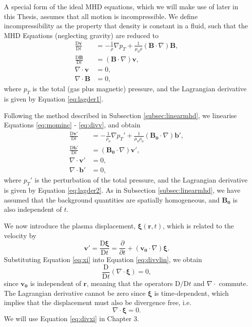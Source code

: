 A special form of the ideal MHD equations, which we will make use of later in this Thesis, assumes that all motion is incompressible.
We define incompressibility as the property that density is constant in a fluid, such that the MHD Equations (neglecting gravity) are reduced to
%
\begin{align}
\label{eq:mominc}
\frac{\mathrm{D} \mathbf v}{\mathrm{D} t}
& = - \frac{1}{\rho} \nabla p_T
+ \frac{1}{\mu_0 \rho} ( \mathbf{B} \cdot \nabla ) \mathbf{B},
\\[0.2cm]
\label{eq:indinc}
\frac{\mathrm{D} \mathbf B}{\mathrm{D} t}
& = ( \mathbf{B} \cdot \nabla ) \mathbf{v},
\\[0.2cm]
\label{eq:divv}
\nabla \cdot \mathbf{v} & = 0,
\\[0.1cm]
\nonumber
\nabla \cdot \mathbf{B} & = 0,
\end{align}
%
where $p_T$ is the total (gas plus magnetic) pressure, and the Lagrangian derivative is given by Equation \eqref{eq:lagder1}.

Following the method described in Subsection \ref{subsec:linearmhd}, we linearise Equations \eqref{eq:mominc} - \eqref{eq:divv}, and obtain
%
\begin{align}
\label{eq:mominclin}
\frac{\mathrm{D} \mathbf v'}{\mathrm{D} t}
& = - \frac{1}{\rho_0} \nabla p_T'
+ \frac{1}{\mu_0 \rho_0} ( \mathbf{B_0} \cdot \nabla ) \mathbf{b'},
\\[0.2cm]
\label{eq:indinclin}
\frac{\mathrm{D} \mathbf b'}{\mathrm{D} t}
& = ( \mathbf{B_0} \cdot \nabla ) \mathbf{v'},
\\[0.2cm]
\label{eq:divvlin}
\nabla \cdot \mathbf{v'} & = 0,
\\[0.1cm]
\nonumber
\nabla \cdot \mathbf{b}' & = 0,
\end{align}
%
where $p_T'$ is the perturbation of the total pressure, and the Lagrangian derivative is given by Equation \eqref{eq:lagder2}.
As in Subsection \ref{subsec:linearmhd}, we have assumed that the background quantities are spatially homogeneous, and $\mathbf{B_0}$ is also independent of $t$.

We now introduce the plasma displacement, $\bm \xi (\mathbf{r}, t)$, which is related to the velocity by
%
\begin{equation}
\label{eq:xi}
\mathbf{v'}
= \frac{\mathrm{D} \bm \xi}{\mathrm{D} t}
= \frac{\partial}{\partial t}
+ ( \mathbf{v_0} \cdot \nabla ) \bm \xi.
\end{equation}
%
Substituting Equation \eqref{eq:xi} into Equation \eqref{eq:divvlin}, we obtain
%
\begin{equation}
\frac{\mathrm{D}}{\mathrm{D} t} ( \nabla \cdot \bm \xi ) = 0,
\end{equation}
%
since $\mathbf{v_0}$ is independent of $\mathbf{r}$, meaning that the operators $\mathrm{D}/\mathrm{D} t$ and $\nabla \cdot$ commute.
The Lagrangian derivative cannot be zero since $\bm \xi$ is time-dependent, which implies that the displacement must also be divergence free, i.e.
%
\begin{equation}
\label{eq:divxi}
\nabla \cdot \bm \xi = 0.
\end{equation}
%
We will use Equation \eqref{eq:divxi} in Chapter 3.

